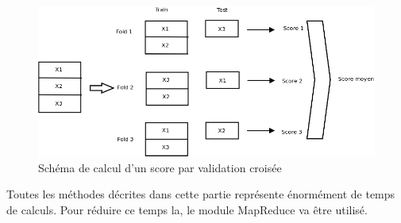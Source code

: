\begin{figure}[htpb]
	\centering
	\includegraphics[scale = 0.25]{images/Valid_Croisee_param}
	\caption{Schéma de calcul d'un score par validation croisée}
	\label{fig:Valid_Croisee_param}
\end{figure}


Toutes les méthodes décrites dans cette partie représente énormément de temps de calculs.
Pour réduire ce temps la, le module MapReduce va être utilisé. 